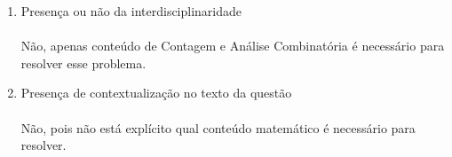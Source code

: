 \documentclass[a4paper, 12pt]{article}
\begin{document}
\begin{enumerate}
\begin{enumerate}
  \item Presença ou não da interdisciplinaridade \\\\
    Não, apenas conteúdo de Contagem e Análise Combinatória é necessário para resolver esse problema.
  \item Presença de contextualização no texto da questão\\\\
    Não, pois não está explícito qual conteúdo matemático é necessário para resolver.
  \end{enumerate}
\end{enumerate}
\end{document}
